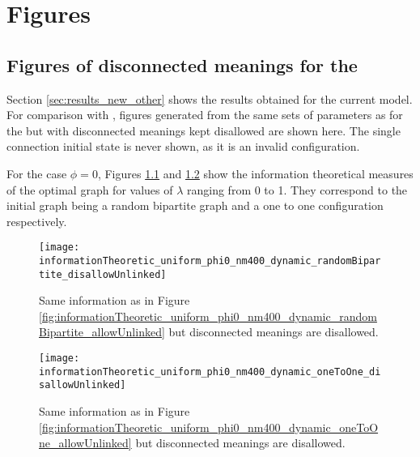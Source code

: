 \chapter{Figures}
\label{cha:app_figures}


\section{Figures of disconnected meanings for the \secondmodel{}}
\label{sec:app_figures_second-model}

Section \ref{sec:results_new_other} shows the results obtained for the current model.
For comparison with \cite{Ferrer2003a}, figures generated from the same sets of parameters as for the \secondmodel{}  but with disconnected meanings kept disallowed are shown here.
The single connection initial state is never shown, as it is an invalid configuration.

For the case $\phi=0$, Figures \ref{fig:informationTheoretic_uniform_phi0_nm400_dynamic_randomBipartite_disallowUnlinked} and \ref{fig:informationTheoretic_uniform_phi0_nm400_dynamic_oneToOne_disallowUnlinked} show the information theoretical measures of the optimal graph for values of $\lambda$ ranging from 0 to 1. They correspond to the initial graph being a random bipartite graph and a one to one configuration respectively.

\begin{figure}
  \centering
  \texttt{[image: informationTheoretic\_uniform\_phi0\_nm400\_dynamic\_randomBipartite\_disallowUnlinked]}
  \caption{Same information as in Figure \ref{fig:informationTheoretic_uniform_phi0_nm400_dynamic_randomBipartite_allowUnlinked} but disconnected meanings are disallowed.}
  \label{fig:informationTheoretic_uniform_phi0_nm400_dynamic_randomBipartite_disallowUnlinked}
\end{figure}

\begin{figure}
  \centering
  \texttt{[image: informationTheoretic\_uniform\_phi0\_nm400\_dynamic\_oneToOne\_disallowUnlinked]}
  \caption{Same information as in Figure \ref{fig:informationTheoretic_uniform_phi0_nm400_dynamic_oneToOne_allowUnlinked} but disconnected meanings are disallowed.}
  \label{fig:informationTheoretic_uniform_phi0_nm400_dynamic_oneToOne_disallowUnlinked}
\end{figure}

